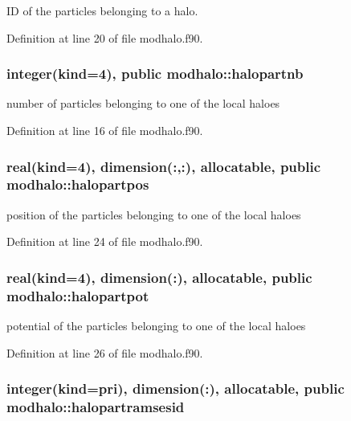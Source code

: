 I\-D of the particles belonging to a halo. 



Definition at line 20 of file modhalo.\-f90.

\hypertarget{classmodhalo_aa2c5c12e5bd7198d5571d7ff832ffa38}{
\subsubsection[{halopartnb}]{\setlength{\rightskip}{0pt plus 5cm}integer(kind=4), public modhalo\-::halopartnb}}\label{classmodhalo_aa2c5c12e5bd7198d5571d7ff832ffa38}


number of particles belonging to one of the local haloes 



Definition at line 16 of file modhalo.\-f90.

\hypertarget{classmodhalo_a92a746382aef848ff806f8eead8ca9e5}{
\subsubsection[{halopartpos}]{\setlength{\rightskip}{0pt plus 5cm}real(kind=4), dimension(\-:,\-:), allocatable, public modhalo\-::halopartpos}}\label{classmodhalo_a92a746382aef848ff806f8eead8ca9e5}


position of the particles belonging to one of the local haloes 



Definition at line 24 of file modhalo.\-f90.

\hypertarget{classmodhalo_a5d7a2e398703c4b5e5826d4e80638f6b}{
\subsubsection[{halopartpot}]{\setlength{\rightskip}{0pt plus 5cm}real(kind=4), dimension(\-:), allocatable, public modhalo\-::halopartpot}}\label{classmodhalo_a5d7a2e398703c4b5e5826d4e80638f6b}


potential of the particles belonging to one of the local haloes 



Definition at line 26 of file modhalo.\-f90.

\hypertarget{classmodhalo_a3c78e77057ed6c209d4081c8d559aed3}{
\subsubsection[{halopartramsesid}]{\setlength{\rightskip}{0pt plus 5cm}integer(kind=pri), dimension(\-:), allocatable, public modhalo\-::halopartramsesid}}\label{classmodhalo_a3c78e77057ed6c209d4081c8d559aed3}


